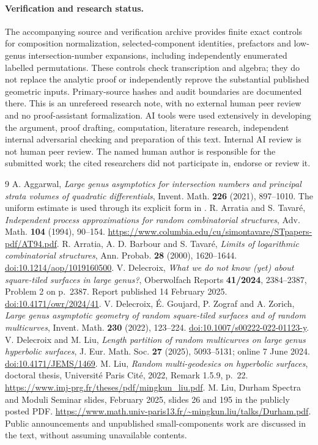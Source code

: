\documentclass[11pt]{article}
\theoremstyle{remark}\newtheorem{remark}[theorem]{Remark}
\begin{document}
\paragraph{Verification and research status.}
The accompanying source and verification archive provides finite exact controls for composition normalization, selected-component identities, prefactors and low-genus intersection-number expansions, including independently enumerated labelled permutations. These controls check transcription and algebra; they do not replace the analytic proof or independently reprove the substantial published geometric inputs. Primary-source hashes and audit boundaries are documented there. This is an unrefereed research note, with no external human peer review and no proof-assistant formalization. AI tools were used extensively in developing the argument, proof drafting, computation, literature research, independent internal adversarial checking and preparation of this text. Internal AI review is not human peer review. The named human author is responsible for the submitted work; the cited researchers did not participate in, endorse or review it.

\begin{thebibliography}{9}
 A. Aggarwal, \emph{Large genus asymptotics for intersection numbers and principal strata volumes of quadratic differentials}, Invent. Math. \textbf{226} (2021), 897--1010. The uniform estimate is used through its explicit form in \cite{DL}.
 R. Arratia and S. Tavar\'e, \emph{Independent process approximations for random combinatorial structures}, Adv. Math. \textbf{104} (1994), 90--154. \url{https://www.columbia.edu/cu/simontavare/STpapers-pdf/AT94.pdf}.
 R. Arratia, A. D. Barbour and S. Tavar\'e, \emph{Limits of logarithmic combinatorial structures}, Ann. Probab. \textbf{28} (2000), 1620--1644. \href{https://doi.org/10.1214/aop/1019160500}{doi:10.1214/aop/1019160500}.
 V. Delecroix, \emph{What we do not know (yet) about square-tiled surfaces in large genus?}, Oberwolfach Reports \textbf{41/2024}, 2384--2387, Problem 2 on p.~2387. Report published 14 February 2025. \href{https://doi.org/10.4171/owr/2024/41}{doi:10.4171/owr/2024/41}.
 V. Delecroix, \'E. Goujard, P. Zograf and A. Zorich, \emph{Large genus asymptotic geometry of random square-tiled surfaces and of random multicurves}, Invent. Math. \textbf{230} (2022), 123--224. \href{https://doi.org/10.1007/s00222-022-01123-y}{doi:10.1007/s00222-022-01123-y}.
 V. Delecroix and M. Liu, \emph{Length partition of random multicurves on large genus hyperbolic surfaces}, J. Eur. Math. Soc. \textbf{27} (2025), 5093--5131; online 7 June 2024. \href{https://doi.org/10.4171/JEMS/1469}{doi:10.4171/JEMS/1469}.
 M. Liu, \emph{Random multi-geodesics on hyperbolic surfaces}, doctoral thesis, Universit\'e Paris Cit\'e, 2022, Remark 1.5.9, p.~22. \url{https://www.imj-prg.fr/theses/pdf/mingkun_liu.pdf}.
 M. Liu, Durham Spectra and Moduli Seminar slides, February 2025, slides 26 and 195 in the publicly posted PDF. \url{https://www.math.univ-paris13.fr/~mingkun.liu/talks/Durham.pdf}. Public announcements and unpublished small-components work are discussed in the text, without assuming unavailable contents.
\end{thebibliography}
\end{document}
